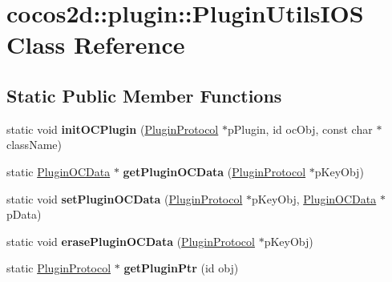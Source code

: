 \hypertarget{classcocos2d_1_1plugin_1_1PluginUtilsIOS}{}\section{cocos2d\+:\+:plugin\+:\+:Plugin\+Utils\+I\+OS Class Reference}
\label{classcocos2d_1_1plugin_1_1PluginUtilsIOS}
\subsection*{Static Public Member Functions}
\begin{DoxyCompactItemize}
\item 
\mbox{\label{classcocos2d_1_1plugin_1_1PluginUtilsIOS_a27db0748209e69ccd64c42d2a2f4ed76}} 
static void {\bfseries init\+O\+C\+Plugin} (\hyperlink{classcocos2d_1_1plugin_1_1PluginProtocol}{Plugin\+Protocol} $\ast$p\+Plugin, id oc\+Obj, const char $\ast$class\+Name)
\item 
\mbox{\label{classcocos2d_1_1plugin_1_1PluginUtilsIOS_ae153a42ee893fa24793a788b246493f7}} 
static \hyperlink{structcocos2d_1_1plugin_1_1__PluginOCData}{Plugin\+O\+C\+Data} $\ast$ {\bfseries get\+Plugin\+O\+C\+Data} (\hyperlink{classcocos2d_1_1plugin_1_1PluginProtocol}{Plugin\+Protocol} $\ast$p\+Key\+Obj)
\item 
\mbox{\label{classcocos2d_1_1plugin_1_1PluginUtilsIOS_a781b5c30f762f7d63da66c0953459179}} 
static void {\bfseries set\+Plugin\+O\+C\+Data} (\hyperlink{classcocos2d_1_1plugin_1_1PluginProtocol}{Plugin\+Protocol} $\ast$p\+Key\+Obj, \hyperlink{structcocos2d_1_1plugin_1_1__PluginOCData}{Plugin\+O\+C\+Data} $\ast$p\+Data)
\item 
\mbox{\label{classcocos2d_1_1plugin_1_1PluginUtilsIOS_ad69cf727d96a5f03049f45101f2b4f8b}} 
static void {\bfseries erase\+Plugin\+O\+C\+Data} (\hyperlink{classcocos2d_1_1plugin_1_1PluginProtocol}{Plugin\+Protocol} $\ast$p\+Key\+Obj)
\item 
\mbox{\label{classcocos2d_1_1plugin_1_1PluginUtilsIOS_ab3dd2aa67d92516bfd6aa39b8237afa1}} 
static \hyperlink{classcocos2d_1_1plugin_1_1PluginProtocol}{Plugin\+Protocol} $\ast$ {\bfseries get\+Plugin\+Ptr} (id obj)

\end{DoxyCompactItemize}
